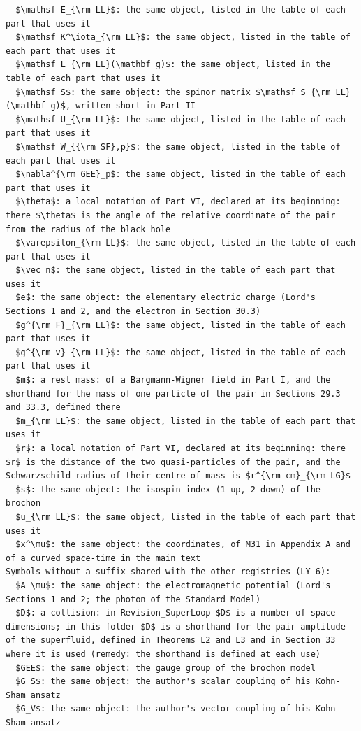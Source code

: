 \documentclass[
  10pt,
]{article}
\begin{document}
\begin{verbatim}
  $\mathsf E_{\rm LL}$: the same object, listed in the table of each part that uses it
  $\mathsf K^\iota_{\rm LL}$: the same object, listed in the table of each part that uses it
  $\mathsf L_{\rm LL}(\mathbf g)$: the same object, listed in the table of each part that uses it
  $\mathsf S$: the same object: the spinor matrix $\mathsf S_{\rm LL}(\mathbf g)$, written short in Part II
  $\mathsf U_{\rm LL}$: the same object, listed in the table of each part that uses it
  $\mathsf W_{{\rm SF},p}$: the same object, listed in the table of each part that uses it
  $\nabla^{\rm GEE}_p$: the same object, listed in the table of each part that uses it
  $\theta$: a local notation of Part VI, declared at its beginning: there $\theta$ is the angle of the relative coordinate of the pair from the radius of the black hole
  $\varepsilon_{\rm LL}$: the same object, listed in the table of each part that uses it
  $\vec n$: the same object, listed in the table of each part that uses it
  $e$: the same object: the elementary electric charge (Lord's Sections 1 and 2, and the electron in Section 30.3)
  $g^{\rm F}_{\rm LL}$: the same object, listed in the table of each part that uses it
  $g^{\rm v}_{\rm LL}$: the same object, listed in the table of each part that uses it
  $m$: a rest mass: of a Bargmann-Wigner field in Part I, and the shorthand for the mass of one particle of the pair in Sections 29.3 and 33.3, defined there
  $m_{\rm LL}$: the same object, listed in the table of each part that uses it
  $r$: a local notation of Part VI, declared at its beginning: there $r$ is the distance of the two quasi-particles of the pair, and the Schwarzschild radius of their centre of mass is $r^{\rm cm}_{\rm LG}$
  $s$: the same object: the isospin index (1 up, 2 down) of the brochon
  $u_{\rm LL}$: the same object, listed in the table of each part that uses it
  $x^\mu$: the same object: the coordinates, of M31 in Appendix A and of a curved space-time in the main text
Symbols without a suffix shared with the other registries (LY-6):
  $A_\mu$: the same object: the electromagnetic potential (Lord's Sections 1 and 2; the photon of the Standard Model)
  $D$: a collision: in Revision_SuperLoop $D$ is a number of space dimensions; in this folder $D$ is a shorthand for the pair amplitude of the superfluid, defined in Theorems L2 and L3 and in Section 33 where it is used (remedy: the shorthand is defined at each use)
  $GEE$: the same object: the gauge group of the brochon model
  $G_S$: the same object: the author's scalar coupling of his Kohn-Sham ansatz
  $G_V$: the same object: the author's vector coupling of his Kohn-Sham ansatz

\end{verbatim}
\end{document}
